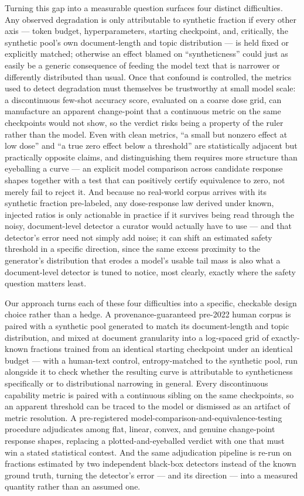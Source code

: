 \documentclass[11pt]{article}
\begin{document}
Turning this gap into a measurable question surfaces four distinct difficulties. Any observed degradation is only attributable to synthetic fraction if every other axis --- token budget, hyperparameters, starting checkpoint, and, critically, the synthetic pool's own document-length and topic distribution --- is held fixed or explicitly matched; otherwise an effect blamed on ``syntheticness'' could just as easily be a generic consequence of feeding the model text that is narrower or differently distributed than usual. Once that confound is controlled, the metrics used to detect degradation must themselves be trustworthy at small model scale: a discontinuous few-shot accuracy score, evaluated on a coarse dose grid, can manufacture an apparent change-point that a continuous metric on the same checkpoints would not show, so the verdict risks being a property of the ruler rather than the model. Even with clean metrics, ``a small but nonzero effect at low dose'' and ``a true zero effect below a threshold'' are statistically adjacent but practically opposite claims, and distinguishing them requires more structure than eyeballing a curve --- an explicit model comparison across candidate response shapes together with a test that can positively certify equivalence to zero, not merely fail to reject it. And because no real-world corpus arrives with its synthetic fraction pre-labeled, any dose-response law derived under known, injected ratios is only actionable in practice if it survives being read through the noisy, document-level detector a curator would actually have to use --- and that detector's error need not simply add noise; it can shift an estimated safety threshold in a specific direction, since the same excess proximity to the generator's distribution that erodes a model's usable tail mass is also what a document-level detector is tuned to notice, most clearly, exactly where the safety question matters least.

Our approach turns each of these four difficulties into a specific, checkable design choice rather than a hedge. A provenance-guaranteed pre-2022 human corpus is paired with a synthetic pool generated to match its document-length and topic distribution, and mixed at document granularity into a log-spaced grid of exactly-known fractions trained from an identical starting checkpoint under an identical budget --- with a human-text control, entropy-matched to the synthetic pool, run alongside it to check whether the resulting curve is attributable to syntheticness specifically or to distributional narrowing in general. Every discontinuous capability metric is paired with a continuous sibling on the same checkpoints, so an apparent threshold can be traced to the model or dismissed as an artifact of metric resolution. A pre-registered model-comparison-and-equivalence-testing procedure adjudicates among flat, linear, convex, and genuine change-point response shapes, replacing a plotted-and-eyeballed verdict with one that must win a stated statistical contest. And the same adjudication pipeline is re-run on fractions estimated by two independent black-box detectors instead of the known ground truth, turning the detector's error --- and its direction --- into a measured quantity rather than an assumed one.
\end{document}
